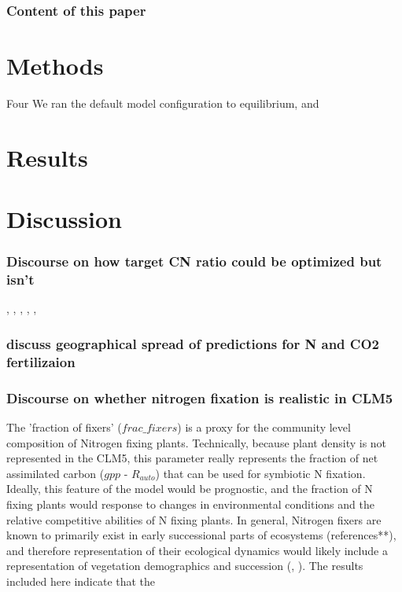\documentclass[draft,linenumbers]{agujournal}
\begin{document}
\subsubsection{Content of this paper}

 

\section{Methods}

Four 
We ran the default model configuration to equilibrium, and 

\section{Results}

\section{Discussion}

\subsubsection{Discourse on how target CN ratio could be optimized but isn't}
\cite{thomas2014}, \cite{friedlingstein1999}, \cite{franklin2012}, \cite{mcmurtrie2013}, \cite{anten2011}, \cite{vanwijk2003}

\subsubsection{discuss geographical spread of predictions for N and CO2 fertilizaion}
\cite{hickler2008}

\subsubsection{Discourse on whether nitrogen fixation is realistic in CLM5}
The 'fraction of fixers' ($frac\_fixers$) is a proxy for the community level composition of Nitrogen fixing plants. Technically, because plant density is not represented in the CLM5, this parameter really represents the fraction of net assimilated carbon ($gpp$ - $R_{auto}$) that can be used for symbiotic N fixation. Ideally, this feature of the model would be prognostic, and the fraction of N fixing plants would response to changes in environmental conditions and the relative competitive abilities of N fixing plants. In general, Nitrogen fixers are known to primarily exist in early successional parts of ecosystems (references**), and therefore representation of their ecological dynamics would likely include a representation of vegetation demographics and succession (\cite{fisher2018vegetation}, \cite{trugman2016climate}).  The results included here indicate that the 
\end{document}
